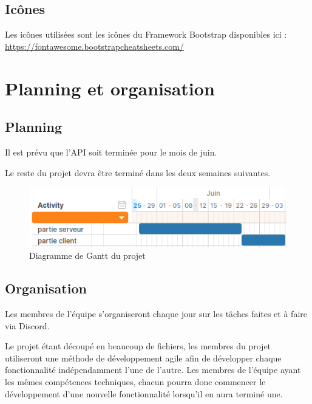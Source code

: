 \documentclass[a4paper, 12pt]{report}
\begin{document}
	\section{Icônes}
		Les icônes utilisées sont les icônes du Framework Bootstrap disponibles ici : 
		\url{https://fontawesome.bootstrapcheatsheets.com/}

\chapter{Planning et organisation}
	\section{Planning}
		Il est prévu que l’API soit terminée pour le mois de juin.

		Le reste du projet devra être terminé dans les deux semaines suivantes. 

		\begin{figure}[h]
	    	\begin{center}
				\includegraphics{img/gantt}
				\caption{Diagramme de Gantt du projet}
				\label{fig:gantt}
			\end{center}
		\end{figure}

	\section{Organisation}
		Les membres de l’équipe s’organiseront chaque jour sur les tâches faites et à faire via Discord. 

		Le projet étant découpé en beaucoup de fichiers, les membres du projet utiliseront une méthode de développement agile afin de développer chaque fonctionnalité indépendamment l’une de l’autre. Les membres de l’équipe ayant les mêmes compétences techniques, chacun pourra donc commencer le développement d’une nouvelle fonctionnalité lorsqu’il en aura terminé une. 
\end{document}
